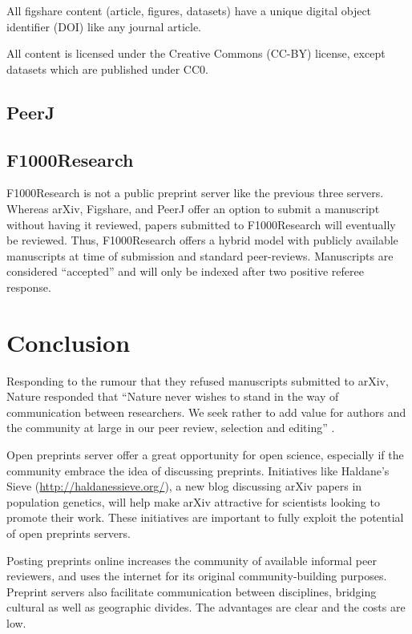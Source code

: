 \documentclass[letterpaper,twocolumn,superscriptaddress,showkeys]{revtex4}
\begin{document}
All figshare content (article, figures, datasets) have a unique digital object
identifier (DOI) like any journal article.

All content is licensed under the Creative Commons (CC-BY) license, except
datasets which are published under CC0.

\subsection{PeerJ}


\subsection{F1000Research}


F1000Research is not a public preprint server like the previous three servers.
Whereas arXiv, Figshare, and PeerJ offer an option to submit a manuscript
without having it reviewed, papers submitted to F1000Research will eventually be
reviewed. Thus, F1000Research offers a hybrid model with publicly available
manuscripts at time of submission and standard peer-reviews. Manuscripts are
considered ``accepted'' and will only be indexed after two positive referee
response.

\section{Conclusion}

Responding to the rumour that they refused manuscripts submitted to arXiv,
Nature responded that ``Nature never wishes to stand in the way of communication
between researchers. We seek rather to add value for authors and the community
at large in our peer review, selection and editing'' \cite{nat05}.

Open preprints server offer a great opportunity for open science, especially if
the community embrace the idea of discussing preprints. Initiatives like
Haldane's Sieve (\href{http://haldanessieve.org/}{http://haldanessieve.org/}), a
new blog discussing arXiv papers in population genetics, will help make arXiv
attractive for scientists looking to promote their work. These initiatives are
important to fully exploit the potential of open preprints servers.

Posting preprints online increases the community of available informal
peer reviewers, and uses the internet for its original
community-building purposes.  Preprint servers also facilitate
communication between disciplines, bridging cultural as well as
geographic divides.
The advantages are clear and the costs are low.
\end{document}
